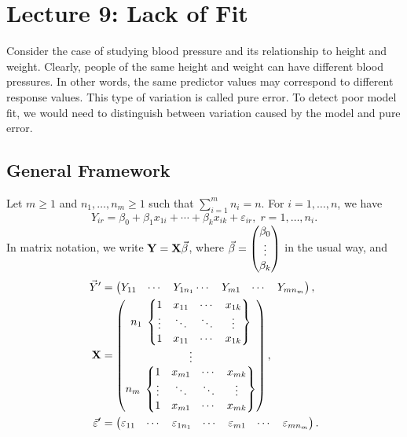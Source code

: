 \section{Lecture 9: Lack of Fit}
Consider the case of studying blood pressure and its relationship to height and weight. Clearly, people of the same height and weight can have different blood pressures. In other words, the same predictor values may correspond to different response values.
This type of variation is called pure error. To detect poor model fit, we would need to distinguish between variation caused by the model and pure error.
\subsection*{General Framework}
Let $ m\ge 1 $ and $ n_1,\ldots,n_m\ge 1 $ such that
$ \sum_{i=1}^{m}n_i=n $. For $ i=1,\ldots,n $, we have
\[ Y_{ir}=\beta_0+\beta_1x_{1i}+\cdots+\beta_k x_{ik}+\varepsilon_{ir},\; r=1,\ldots,n_i. \]
In matrix notation, we write $ \mathbf{Y}=\mathbf{X}\vec{\beta} $, where
$ \vec{\beta}=\begin{pmatrix}
        \beta_0 \\
        \vdots  \\
        \beta_k
    \end{pmatrix} $ in the usual way, and
\begin{align*}
    \vec{Y}'
     & =\begin{pmatrix}
            Y_{11} & \cdots & Y_{1n_1}
            \cdots & Y_{m1} & \cdots   & Y_{mn_m}
        \end{pmatrix},                                        \\
    \mathbf{X}
     & =\begin{pmatrix}
            n_1\; \begin{Bmatrix}
                  1      & x_{11} & \cdots & x_{1k} \\
                  \vdots & \ddots & \ddots & \vdots \\
                  1      & x_{11} & \cdots & x_{1k} \\
              \end{Bmatrix} \\
            \vdots                                  \\
            n_m\; \begin{Bmatrix}
                  1      & x_{m1} & \cdots & x_{mk} \\
                  \vdots & \ddots & \ddots & \vdots \\
                  1      & x_{m1} & \cdots & x_{mk}
              \end{Bmatrix}
        \end{pmatrix},                                      \\
    \vec{\varepsilon}'
     & =\begin{pmatrix}
            \varepsilon_{11} & \cdots & \varepsilon_{1n_1}
                             & \cdots & \varepsilon_{m1}   & \cdots & \varepsilon_{mn_m}
        \end{pmatrix}.
\end{align*}
